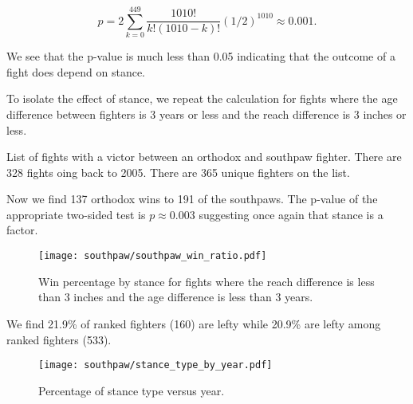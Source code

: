 \begin{equation}
p = 2\sum_{k=0}^{449} \frac{1010!}{k! (1010-k)!}(1/2)^{1010} \approx 0.001.
\end{equation}

We see that the p-value is much less than 0.05 indicating that the outcome of a fight does depend on stance.

To isolate the effect of stance, we repeat the calculation for fights where the age difference between fighters
is 3 years or less and the reach difference is 3 inches or less. 

\begin{center}
\begin{table}[h]

\caption{List of fights with a victor between an orthodox and southpaw fighter. There are 328 fights oing back to 2005. There are 365 unique fighters on the list.}
\end{table}
\end{center}

Now we find 137 orthodox wins to 191 of the southpaws. The p-value of the
appropriate two-sided test is $p \approx 0.003$ suggesting once again
that stance is a factor.

\begin{figure}[h]
\begin{center}
\texttt{[image: southpaw/southpaw\_win\_ratio.pdf]}
\caption{Win percentage by stance for fights where the reach difference
is less than 3 inches and the age difference is less than 3 years.}
\end{center}
\end{figure}

We find 21.9\% of ranked fighters (160) are lefty while 20.9\% are lefty among ranked fighters (533).

\begin{figure}[h]
\begin{center}
\texttt{[image: southpaw/stance\_type\_by\_year.pdf]}
\caption{Percentage of stance type versus year.}
\end{center}
\end{figure}
